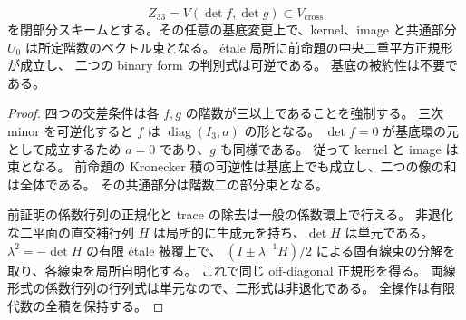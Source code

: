 \begin{corollary}[両階数三のscheme壁における相対正規形]
\label{cor:qa-double-rank-three-scheme-normal-form}
\[
 Z_{33}=V(\det f,\det g)\subset V_{\mathrm{cross}}
\]
を閉部分スキームとする。その任意の基底変更上で、kernel、image と共通部分
$U_0$ は所定階数のベクトル束となる。
\'etale 局所に前命題の中央二重平方正規形が成立し、
二つの binary form の判別式は可逆である。
基底の被約性は不要である。
\end{corollary}
\begin{proof}
四つの交差条件は各 $f,g$ の階数が三以上であることを強制する。
三次 minor を可逆化すると $f$ は $\operatorname{diag}(I_3,a)$ の形となる。
$\det f=0$ が基底環の元として成立するため $a=0$ であり、$g$ も同様である。
従って kernel と image は束となる。
前命題の Kronecker 積の可逆性は基底上でも成立し、二つの像の和は全体である。
その共通部分は階数二の部分束となる。

前証明の係数行列の正規化と trace の除去は一般の係数環上で行える。
非退化な二平面の直交補行列 $H$ は局所的に生成元を持ち、$\det H$ は単元である。
$\lambda^2=-\det H$ の有限 \'etale 被覆上で、
$(I\pm\lambda^{-1}H)/2$ による固有線束の分解を取り、各線束を局所自明化する。
これで同じ off-diagonal 正規形を得る。
両線形式の係数行列の行列式は単元なので、二形式は非退化である。
全操作は有限代数の全積を保持する。
\end{proof}

